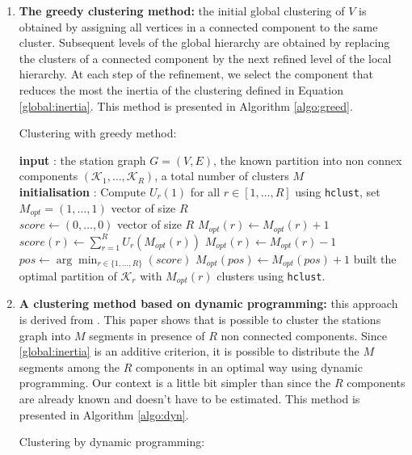 \begin{enumerate}
    \item \textbf{The greedy clustering method:} the initial global clustering of $V$ is obtained by assigning all vertices in a connected component to the same cluster. Subsequent levels of the global hierarchy are obtained by replacing the clusters of a connected component by the next refined level of the local hierarchy. At each step of the refinement, we select the component that reduces the most the inertia of the clustering defined in Equation \eqref{global:inertia}. This method is presented in Algorithm \ref{algo:greed}.
    \begin{algorithm}[htbp]
\caption{Clustering with greedy method:}\label{algo:greed}
\begin{algorithmic}

\State \textbf{input} : the station graph $G=(V,E)$, the known partition into non connex components $(\mathcal{K}_1,\dots,\mathcal{K}_R)$, a total number of clusters $M$ \\
  
\State \textbf{initialisation} : Compute $U_r(1)$ for all $r \in [1,\dots,R]$ using \texttt{hclust}, set $M_{opt} = (1,\dots,1)$ vector of size $R$  \\

  \State $\textit{score}\gets(0,\dots,0)$ vector of size $R$
  \State $M_{opt}(r) \gets M_{opt}(r) + 1$
  \State $\textit{score}(r) \gets \sum_{r=1}^R U_r(M_{opt}(r))$
  \State $M_{opt}(r) \gets M_{opt}(r) - 1$
  \EndFor
  \State $\textit{pos} \gets \arg\min_{r\in\{1,\dots,R\}}(\textit{score})$
  \State $M_{opt}(pos) \gets M_{opt}(pos)+1$
\EndFor
{}
\State built the optimal partition of $\mathcal{K}_r$ with $M_{opt}(r)$ clusters using \texttt{hclust}.
\EndFor

\end{algorithmic}
\end{algorithm}
    \item \textbf{A clustering method based on dynamic programming:} this approach is derived from \cite{hebrail2010exploratory}. This paper shows that is possible to cluster the stations graph into $M$ segments in presence of $R$ non connected components. Since \eqref{global:inertia} is an additive criterion, it is possible to distribute the $M$ segments among the $R$ components in an optimal way using dynamic programming. Our context is a little bit simpler than \cite{hebrail2010exploratory} since the $R$ components are already known and doesn't have to be estimated. This method is presented in Algorithm \ref{algo:dyn}.  
    \begin{algorithm}[htbp]
\caption{Clustering by dynamic programming:}\label{algo:dyn}
\begin{algorithmic}


\end{algorithmic}
\end{algorithm}
\end{enumerate}
